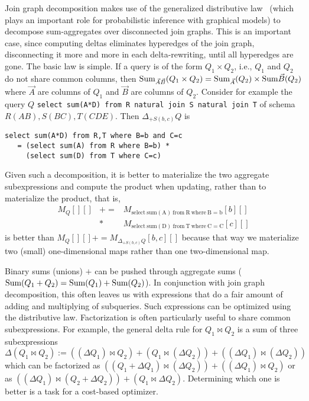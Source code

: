 Join graph decomposition makes use of the generalized distributive law~\cite{aji-toit:00} (which plays
an important role for probabilistic inference with graphical models) to decompose
sum-aggregates over disconnected join graphs. This is an important case, since computing deltas 
eliminates hyperedges of the join graph, disconnecting it more and more in each delta-rewriting, until all
hyperedges are gone. The basic law is simple. If a query is of the form $Q_1 \times Q_2$, i.e., $Q_1$ and
$Q_2$ do not share common columns, then
$\mbox{Sum}_{\vec{A}\vec{B}}(Q_1 \times Q_2) = \mbox{Sum}_{\vec{A}}(Q_2) \times \mbox{Sum}{\vec{B}}(Q_2)$
where $\vec{A}$ are columns of $Q_1$ and $\vec{B}$ are columns of $Q_2.$
Consider for example the query $Q$
{\tt select sum(A*D) from R natural join S natural join T}
of schema $R(AB), S(BC), T(CDE)$. Then
$\Delta_{+S(b,c)} Q$ is
\begin{verbatim}
select sum(A*D) from R,T where B=b and C=c
   = (select sum(A) from R where B=b) *
     (select sum(D) from T where C=c)
\end{verbatim}
Given such a decomposition, it is better to materialize the two aggregate subexpressions and compute
the product when updating, rather than to materialize the product, that is,
\begin{eqnarray*}
M_Q[][] &+=& M_{\mathrm{select~sum(A)~from~R~where~B=b}}[b][] \\
&*& M_{\mathrm{select~sum(D)~from~T~where~C=C}}[c][]
\end{eqnarray*}
is better than
$M_Q[][] += M_{\Delta_{+S(b,c)} Q}[b,c][]$ because that way we materialize two (small) one-dimensional
maps rather than one two-dimensional map.

Binary sums  (unions) $+$ can be pushed through aggregate sums ($\mbox{Sum}(Q_1 + Q_2) = \mbox{Sum}(Q_1) + \mbox{Sum}(Q_2)$).
In conjunction with join graph decomposition, this often leaves us with expressions that do a fair amount
of adding and multiplying of subqueries. Such expressions can be optimized using the distributive law.
Factorization is often particularly useful to share common subexpressions.
For example, the general delta rule for $Q_1 \bowtie Q_2$ is a sum of three subexpressions
$\Delta(Q_1 \bowtie Q_2) := ((\Delta Q_1) \bowtie Q_2) + (Q_1 \bowtie (\Delta Q_2))
 + ((\Delta Q_1) \bowtie (\Delta Q_2))$ which can be factorized as
$((Q_1 + \Delta Q_1) \bowtie (\Delta Q_2)) + ((\Delta Q_1) \bowtie  Q_2)$
or as
$((\Delta Q_1) \bowtie (Q_2 + \Delta Q_2)) + (Q_1 \bowtie \Delta Q_2)$.
Determining which one is better is a task for a cost-based optimizer.







